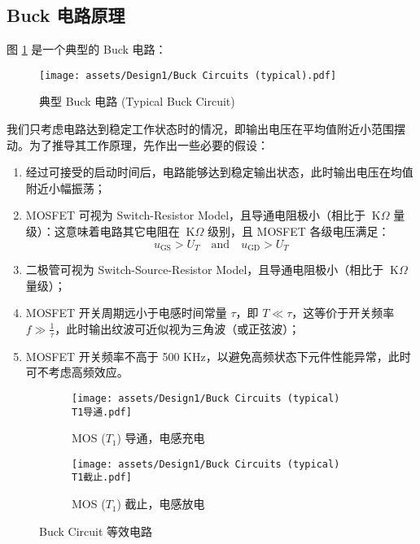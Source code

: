 \documentclass[UTF8]{article}
\def\kO{\ \mathrm{K}\Omega}
\def\KO{\ \mathrm{K}\Omega}
\def\kO{\ \mathrm{K}\Omega}
\def\KO{\ \mathrm{K}\Omega}
\theoremstyle{MyLineTheoremStyle} %
\theoremstyle{MyBlockTheoremStyle} %
\theoremstyle{MySubsubsectionStyle} %
\begin{document}
\subsection{Buck 电路原理}
图 \ref{fig: Typical Buck Circuit} 是一个典型的 Buck 电路：
\begin{figure}[H]\centering
    \texttt{[image: assets/Design1/Buck Circuits (typical).pdf]}
    \caption{典型 Buck 电路 (Typical Buck Circuit)}
    \label{fig: Typical Buck Circuit}
\end{figure}
我们只考虑电路达到稳定工作状态时的情况，即输出电压在平均值附近小范围摆动。为了推导其工作原理，先作出一些必要的假设：
\begin{enumerate}
\item 经过可接受的启动时间后，电路能够达到稳定输出状态，此时输出电压在均值附近小幅振荡；
\item MOSFET 可视为 Switch-Resistor Model，且导通电阻极小（相比于 $\KO$ 量级）：这意味着电路其它电阻在 $\kO$ 级别，且 MOSFET 各级电压满足：
\begin{equation}
u_{\text{GS}} > U_T \quad \text{and} \quad u_{\text{GD}} > U_T
\end{equation}
\item 二极管可视为 Switch-Source-Resistor Model，且导通电阻极小（相比于 $\KO$ 量级）；
\item MOSFET 开关周期远小于电感时间常量 $\tau$，即 $T \ll \tau$，这等价于开关频率 $f \gg \frac{1}{\tau}$，此时输出纹波可近似视为三角波（或正弦波）；
\item MOSFET 开关频率不高于 500 KHz，以避免高频状态下元件性能异常，此时可不考虑高频效应。
\end{enumerate}

\begin{figure}[H]\centering
    \begin{subfigure}[b]{0.5\columnwidth}\centering
        \texttt{[image: assets/Design1/Buck Circuits (typical) T1导通.pdf]}
        \caption{MOS ($T_1$) 导通，电感充电}
    \end{subfigure}\hfill
    \begin{subfigure}[b]{0.5\columnwidth}\centering
        \texttt{[image: assets/Design1/Buck Circuits (typical) T1截止.pdf]}
        \caption{MOS ($T_1$) 截止，电感放电}
    \end{subfigure}
    \caption{Buck Circuit 等效电路}
    \label{Buck Circuit 等效电路}
\end{figure}
\end{document}
